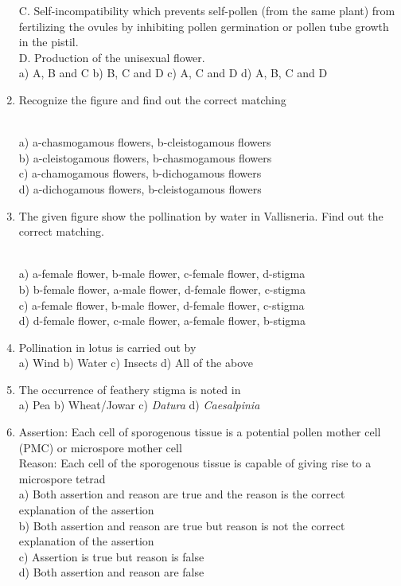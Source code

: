 \begin{enumerate}
  C. Self-incompatibility which prevents self-pollen (from the same
  plant) from fertilizing the ovules by inhibiting pollen germination or
  pollen tube growth in the pistil.\\
  D. Production of the unisexual flower.\\
  a) A, B and C b) B, C and D c) A, C and D d) A, B, C and D
\item
  Recognize the figure and find out the correct matching\\
  \strut \\
  a) a-chasmogamous flowers, b-cleistogamous flowers\\
  b) a-cleistogamous flowers, b-chasmogamous flowers\\
  c) a-chamogamous flowers, b-dichogamous flowers\\
  d) a-dichogamous flowers, b-cleistogamous flowers
\item
  The given figure show the pollination by water in Vallisneria. Find
  out the correct matching.\\
  \strut \\
  a) a-female flower, b-male flower, c-female flower, d-stigma\\
  b) b-female flower, a-male flower, d-female flower, c-stigma\\
  c) a-female flower, b-male flower, d-female flower, c-stigma\\
  d) d-female flower, c-male flower, a-female flower, b-stigma
\item
  Pollination in lotus is carried out by\\
  a) Wind b) Water c) Insects d) All of the above
\item
  The occurrence of feathery stigma is noted in\\
  a) Pea b) Wheat/Jowar c) \emph{Datura} d) \emph{Caesalpinia}
\item
  Assertion: Each cell of sporogenous tissue is a potential pollen
  mother cell (PMC) or microspore mother cell\\
  Reason: Each cell of the sporogenous tissue is capable of giving rise
  to a microspore tetrad\\
  a) Both assertion and reason are true and the reason is the correct
  explanation of the assertion\\
  b) Both assertion and reason are true but reason is not the correct
  explanation of the assertion\\
  c) Assertion is true but reason is false\\
  d) Both assertion and reason are false

\end{enumerate}
